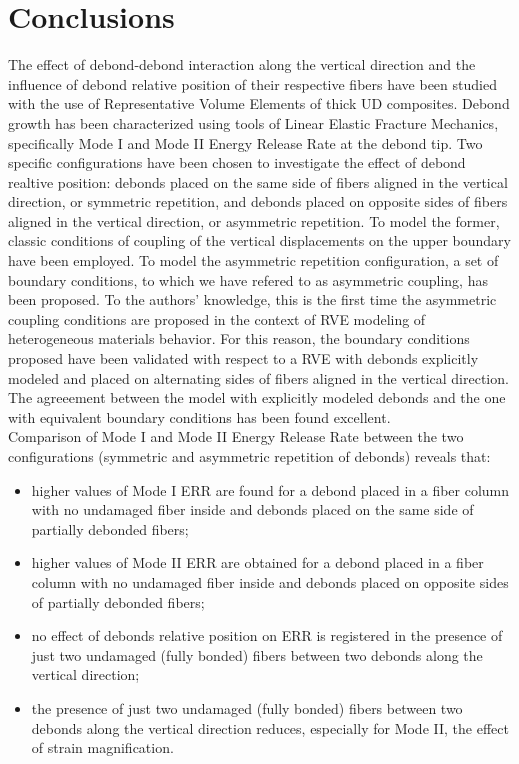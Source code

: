 \documentclass[smallextended]{svjour3}       %
\begin{document}
\section{Conclusions}\label{sec:conclusions}

The effect of debond-debond interaction along the vertical direction and the influence of debond relative position of their respective fibers have been studied with the use of Representative Volume Elements of thick UD composites. Debond growth has been characterized using tools of Linear Elastic Fracture Mechanics, specifically Mode I and Mode II Energy Release Rate at the debond tip. Two specific configurations have been chosen to investigate the effect of debond realtive position: debonds placed on the same side of fibers aligned in the vertical direction, or symmetric repetition, and debonds placed on opposite sides of fibers aligned in the vertical direction, or asymmetric repetition. To model the former, classic conditions of coupling of the vertical displacements on the upper boundary have been employed. To model the asymmetric repetition configuration, a set of boundary conditions, to which we have refered to as asymmetric coupling, has been proposed. To the authors' knowledge, this is the first time the asymmetric coupling conditions are proposed in the context of RVE modeling of heterogeneous materials behavior. For this reason, the boundary conditions proposed have been validated with respect to a RVE with debonds explicitly modeled and placed on alternating sides of fibers aligned in the vertical direction. The agreeement between the model with explicitly modeled debonds and the one with equivalent boundary conditions has been found excellent.\\
Comparison of Mode I and Mode II Energy Release Rate between the two configurations (symmetric and asymmetric repetition of debonds) reveals that:

\begin{itemize}
\item higher values of Mode I ERR are found for a debond placed in a fiber column with no undamaged fiber inside and debonds placed on the same side of partially debonded fibers;
\item higher values of Mode II ERR are obtained for a debond placed in a fiber column with no undamaged fiber inside and debonds placed on opposite sides of partially debonded fibers;
\item no effect of debonds relative position on ERR is registered in the presence of just two undamaged (fully bonded) fibers between two debonds along the vertical direction;
\item the presence of just two undamaged (fully bonded) fibers between two debonds along the vertical direction reduces, especially for Mode II, the effect of strain magnification.
\end{itemize}
\end{document}
